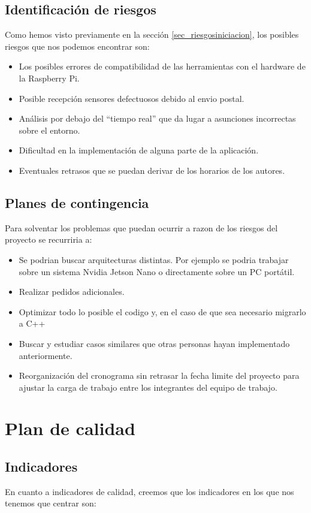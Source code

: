 \subsection{Identificación de riesgos}
Como hemos visto previamente en la sección \ref{sec_riesgosiniciacion}, los posibles riesgos que nos podemos encontrar son:
\begin{itemize}
    \item Los posibles errores de compatibilidad de las herramientas con el hardware de la Raspberry Pi.
    \item Posible recepción sensores defectuosos debido al envio postal.
    \item Análisis por debajo del ``tiempo real'' que da lugar a asunciones incorrectas sobre el entorno.
    \item Dificultad en la implementación de alguna parte de la aplicación.
    \item Eventuales retrasos que se puedan derivar de los horarios de los autores.
\end{itemize}


\subsection{Planes de contingencia}
Para solventar los problemas que puedan ocurrir a razon de los riesgos del proyecto se recurriria a:

\begin{itemize}
  \item Se podrian buscar arquitecturas distintas. Por ejemplo se podria trabajar sobre un sistema Nvidia Jetson Nano o directamente sobre un PC portátil.
  \item Realizar pedidos adicionales.
  \item Optimizar todo lo posible el codigo y, en el caso de que sea necesario migrarlo a C++
  \item Buscar y estudiar casos similares que otras personas hayan implementado anteriormente.
  \item Reorganización del cronograma sin retrasar la fecha limite del proyecto para ajustar la carga de trabajo entre los integrantes del equipo de trabajo.
\end{itemize}

\section{Plan de calidad}
\subsection{Indicadores}
En cuanto a indicadores de calidad, creemos que los indicadores en los que nos tenemos que centrar son:

